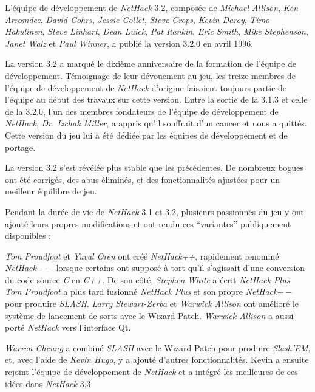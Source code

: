 \documentclass[titlepage]{article}
\begin{document}
\medskip
\noindent L'équipe de développement de \textit{NetHack} 3.2, composée de \textit{Michael Allison}, \textit{Ken
Arromdee}, \textit{David Cohrs}, \textit{Jessie Collet}, \textit{Steve Creps}, {\it
Kevin Darcy}, \textit{Timo Hakulinen}, \textit{Steve Linhart}, \textit{Dean Luick},
\textit{Pat Rankin}, \textit{Eric Smith}, \textit{Mike Stephenson}, \textit{Janet Walz}
et \textit{Paul Winner}, a publié la version 3.2.0 en avril 1996.

\medskip
\noindent La version 3.2 a marqué le dixième anniversaire de la formation de
l'équipe de développement.
Témoignage de leur dévouement au jeu, les treize membres
de l'équipe de développement de \textit{NetHack} d'origine faisaient toujours partie de l'équipe au
début des travaux sur cette version.
Entre la sortie de la 3.1.3 et celle de la 3.2.0,
l'un des membres fondateurs de l'équipe de développement de \textit{NetHack},
\textit{Dr. Izchak Miller}, a appris qu'il souffrait d'un cancer et nous a quittés.
Cette version du jeu lui a été
dédiée par les équipes de développement et de portage.

La version 3.2 s'est révélée plus stable que les précédentes.
De nombreux bogues ont été corrigés, des abus éliminés, et des fonctionnalités ajustées
pour un meilleur équilibre de jeu.

\medskip
Pendant la durée de vie de \textit{NetHack} 3.1 et 3.2, plusieurs passionnés
du jeu y ont ajouté
leurs propres modifications et ont rendu ces ``variantes'' publiquement
disponibles :

\medskip
\textit{Tom Proudfoot} et \textit{Yuval Oren} ont créé \textit{NetHack++},
rapidement renommé \textit{NetHack$--$}
lorsque certains ont supposé à tort qu'il s'agissait d'une conversion du
code source \textit{C} en \textit{C++}.
De son côté, \textit{Stephen White} a écrit \textit{NetHack Plus}.
\textit{Tom Proudfoot} a plus tard fusionné \textit{NetHack Plus}
et son propre \textit{NetHack$--$} pour produire \textit{SLASH}.
\textit{Larry Stewart-Zerba} et \textit{Warwick Allison} ont amélioré le système
de lancement de sorts avec le Wizard Patch.
\textit{Warwick Allison} a aussi porté \textit{NetHack} vers l'interface Qt.

\medskip
\textit{Warren Cheung} a combiné \textit{SLASH} avec le Wizard Patch
pour produire \textit{Slash'EM}, et,
avec l'aide de \textit{Kevin Hugo}, y a ajouté d'autres fonctionnalités.
Kevin a ensuite rejoint l'équipe de développement de \textit{NetHack} et a intégré
les meilleures de ces idées dans \textit{NetHack} 3.3.
\end{document}

